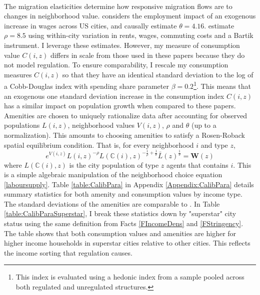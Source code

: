 \documentclass[12pt]{article}
\begin{document}
\paragraph*{}
The migration elasticities determine how responsive migration flows are to changes in neighborhood value. \cite{morettihornbeck} considers the employment impact of an exogenous increase in wages across US cities, and causally estimate $\theta = 4.16$. \cite{BSH} estimate $\rho = 8.5$ using within-city variation in rents, wages, commuting costs and a Bartik instrument. I leverage these estimates. However, my measure of consumption value $C(i, z)$ differs in scale from those used in these papers because they do not model regulation. To ensure comparability, I rescale my consumption measures $C(i, z)$ so that they have an identical standard deviation to the log of a Cobb-Douglas index with spending share parameter $\beta = 0.2$\footnote{This index is evaluated using a hedonic index from a sample pooled across both regulated and unregulated structures.}. This means that an exogenous one standard deviation increase in the consumption index $C(i, z)$ has a similar impact on population growth when compared to these papers. Amenities are chosen to uniquely rationalize data after accounting for observed populations $L(i, z)$, neighborhood values $V(i, z)$, $\rho$ and $\theta$ (up to a normalization). This amounts to choosing amenities to satisfy a Rosen-Roback spatial equilibrium condition. That is, for every neighborhood $i$ and type $z$,
\begin{equation}\label{RosenRobackCalibrate}
 e^{V(i, z)}L(i, z)^{-\rho}L(\mathbb{C}(i), z)^{-\frac{1}{\rho} + \frac{1}{\theta}}\bar{L}(z)^{\frac{1}{\theta}} = \boldsymbol{W}(z) 
\end{equation}
 where $L(\mathbb{C}(i), z)$ is the city population of type $z$ agents that contains $i$. This is a simple algebraic manipulation of the neighborhood choice equation \eqref{laboursupply}. Table \ref{table:CalibPara} in Appendix \ref{Appendix:CalibPara} details summary statistics for both amenity and consumption values by income type. The standard deviations of the amenities are comparable to \cite{hseihmoretti}. In Table \ref{table:CalibParaSuperstar}, I break these statistics down by "superstar" city status using the same definition from Facts \ref{FIncomeDens} and \ref{FStringency}. The table shows that both consumption values and amenities are higher for higher income households in superstar cities relative to other cities. This reflects the income sorting that regulation causes.
\end{document}

